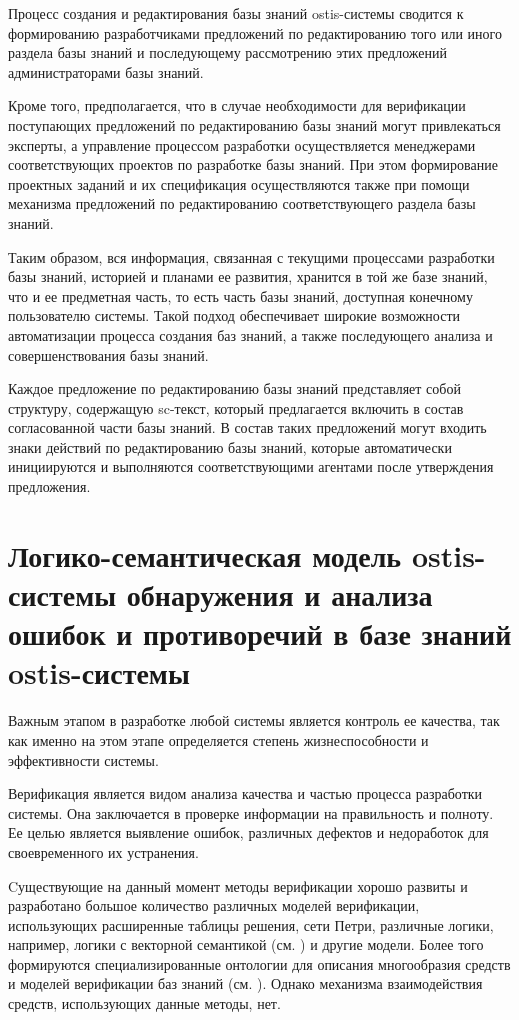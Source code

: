 Процесс создания и редактирования базы знаний ostis-системы сводится к формированию разработчиками предложений по редактированию того или иного раздела базы знаний и последующему рассмотрению этих предложений администраторами базы знаний.


Кроме того, предполагается, что в случае необходимости для верификации поступающих предложений по редактированию базы знаний могут привлекаться эксперты, а управление процессом разработки осуществляется менеджерами соответствующих проектов по разработке базы знаний.
При этом формирование проектных заданий и их спецификация осуществляются также при помощи механизма предложений по редактированию соответствующего раздела базы знаний.

Таким образом, вся информация, связанная с текущими процессами разработки базы знаний, историей и планами ее развития, хранится в той же базе знаний, что и ее предметная часть, то есть часть базы знаний, доступная конечному пользователю системы. Такой подход обеспечивает широкие возможности автоматизации процесса создания баз знаний, а также последующего анализа и совершенствования базы знаний.

Каждое предложение по редактированию базы знаний представляет собой структуру, содержащую sc-текст, который предлагается включить в состав согласованной части базы знаний. В состав таких предложений могут входить знаки действий по редактированию базы знаний, которые автоматически инициируются и выполняются соответствующими агентами после утверждения предложения.


\section{Логико-семантическая модель ostis-системы обнаружения и анализа ошибок и противоречий в базе знаний ostis-системы}
\label{sec_kb_design_contradiction}

Важным этапом в разработке любой системы является контроль ее качества, так как именно на этом этапе определяется степень жизнеспособности и эффективности системы.

Верификация является видом анализа качества и частью процесса разработки системы. Она заключается в проверке информации на правильность и полноту.
Ее целью является выявление ошибок, различных дефектов и недоработок для своевременного их устранения.

Cуществующие на данный момент методы верификации хорошо развиты и разработано большое количество различных моделей верификации, использующих расширенные таблицы решения, сети Петри, различные логики, например, логики с векторной семантикой (см. ) и другие модели. Более того формируются специализированные онтологии для описания многообразия средств и моделей верификации баз знаний (см. ). Однако механизма взаимодействия средств, использующих данные методы, нет.

